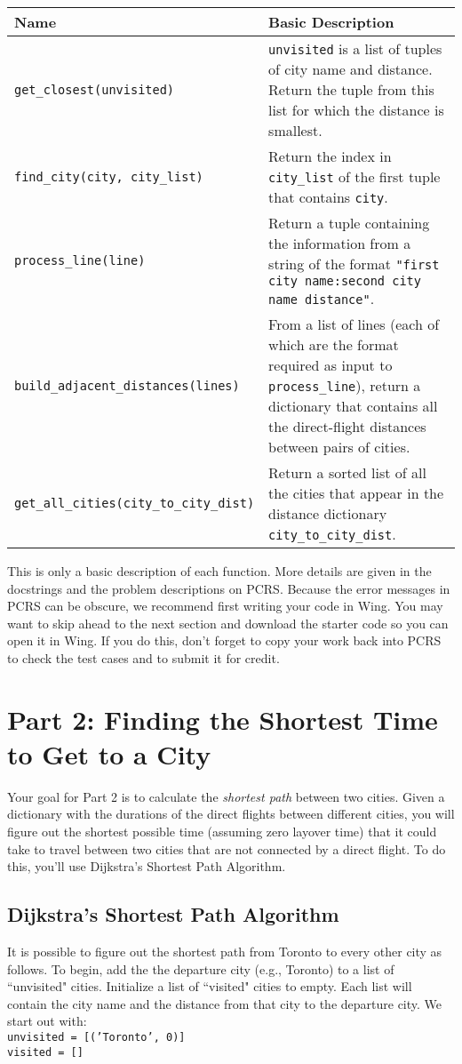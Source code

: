 \documentclass{assignment}
\begin{document}
\begin{tabular}{|l|p{10cm}|}
\hline
{\bf Name} & {\bf Basic Description} \\ \hline
\verb|get_closest(unvisited)| & \verb|unvisited| is a list of tuples of city name and distance. Return the tuple from this list for which the distance is smallest. \\ \hline
\verb|find_city(city, city_list)| & Return the index in \verb|city_list| of the first tuple that contains \verb|city|.  \\\hline
\verb|process_line(line)| & Return a tuple containing the information from a string of the format \verb|"first city name:second city name distance"|. \\ \hline
\verb|build_adjacent_distances(lines)| & From a list of lines (each of which are the format required as input to \verb|process_line|), return a dictionary that contains all the direct-flight distances between pairs of cities.\\ \hline
\verb|get_all_cities(city_to_city_dist)| & Return a sorted list of all the cities that appear in the distance dictionary \verb|city_to_city_dist|.\\ \hline


\end{tabular} 

This is only a basic description of each function. More details are given in the docstrings and the problem descriptions on PCRS.
Because the error messages in PCRS can be obscure, we recommend first writing your code in Wing. You may want to skip ahead to the next section and download the starter code so you can open it in Wing. If you do this, don't forget to copy your work back into PCRS to check the test cases and to submit it for credit.
\vspace*{-0.6cm}
\section*{Part 2: Finding the Shortest Time to Get to a City}

Your goal for Part 2 is to calculate the \textit{shortest path} between two cities. Given a dictionary with the durations of the direct flights between different cities, you will figure out the shortest possible time (assuming zero layover time) that it could take to travel between two cities that are not connected by a direct flight. To do this, you'll use Dijkstra's Shortest Path Algorithm.

\vspace*{-0.6cm}\subsection*{Dijkstra's Shortest Path Algorithm}
It is possible to figure out the shortest path from Toronto to every other city as follows.  To begin, add the the departure city (e.g., Toronto) to a list of ``unvisited" cities.  Initialize a list of ``visited" cities to empty.  Each list will contain the city name and the distance from that city to the departure city.  We start out with:\\
\texttt{unvisited = [('Toronto', 0)]}\\
\texttt{visited = []}
\end{document}
